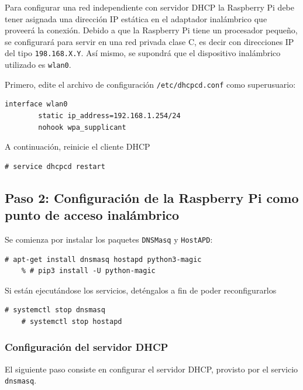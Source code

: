 \documentclass[letterpaper,10.5pt]{article}
\begin{document}
Para configurar una red independiente con servidor DHCP la Raspberry Pi debe tener asignada una dirección IP estática en el adaptador inalámbrico que proveerá la conexión.
Debido a que la Raspberry Pi tiene un procesador pequeño, se configurará para servir en una red privada clase C, es decir con direcciones IP del tipo \texttt{198.168.X.Y}.
Así mismo, se supondrá que el dispositivo inalámbrico utilizado es \texttt{wlan0}.


Primero, edite el archivo de configuración \texttt{/etc/dhcpcd.conf} como superusuario:

\begin{Verbatim}[gobble=1,commentchar=\%]
	interface wlan0
	    static ip_address=192.168.1.254/24
	    nohook wpa_supplicant
\end{Verbatim}

A continuación, reinicie el cliente DHCP

\begin{Verbatim}[gobble=1,commentchar=\%]
	# service dhcpcd restart
\end{Verbatim}




%
%
\subsection{Paso 2: Configuración de la Raspberry Pi como punto de acceso inalámbrico}%
\label{sec:ap}

Se comienza por instalar los paquetes \texttt{DNSMasq} y \texttt{HostAPD}:

\begin{Verbatim}[gobble=1,commentchar=\%]
	# apt-get install dnsmasq hostapd python3-magic
	% # pip3 install -U python-magic
\end{Verbatim}

Si están ejecutándose los servicios, deténgalos a fin de poder reconfigurarlos
\begin{Verbatim}[gobble=1,commentchar=\%]
	# systemctl stop dnsmasq
	# systemctl stop hostapd
\end{Verbatim}


\subsubsection{Configuración del servidor DHCP}%
\label{sec:ap-dhcp}
El siguiente paso consiste en configurar el servidor DHCP, provisto por el servicio \texttt{dnsmasq}.
\end{document}
